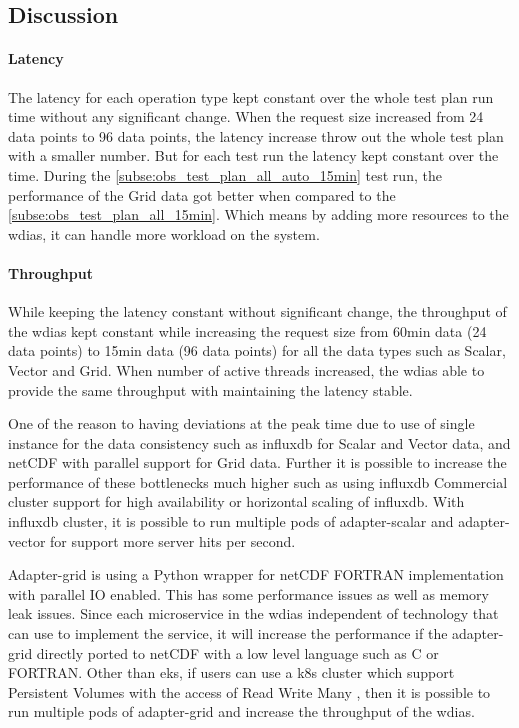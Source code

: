 \documentclass[conference]{IEEEtran}
\begin{document}
\subsection{Discussion}
\paragraph{Latency}
The latency for each operation type kept constant over the whole test plan run time without any significant change. When the request size increased from 24 data points to 96 data points, the latency increase throw out the whole test plan with a smaller number. But for each test run the latency kept constant over the time.
During the \ref{subse:obs_test_plan_all_auto_15min} test run, the performance of the Grid data got better when compared to the \ref{subse:obs_test_plan_all_15min}. Which means by adding more resources to the \acrshort{wdias}, it can handle more workload on the system.

\paragraph{Throughput}
While keeping the latency constant without significant change, the throughput of the \acrshort{wdias} kept constant while increasing the request size from 60min data (24 data points) to 15min data (96 data points) for all the data types such as Scalar, Vector and Grid.
When number of active threads increased, the \acrshort{wdias} able to provide the same throughput with maintaining the latency stable.

One of the reason to having deviations at the peak time due to use of single instance for the data consistency such as \acrshort{influxdb} for Scalar and Vector data, and netCDF with parallel support for Grid data. Further it is possible to increase the performance of these bottlenecks much higher such as using \acrshort{influxdb} Commercial cluster support for high availability or horizontal scaling of \acrshort{influxdb}. With \acrshort{influxdb} cluster, it is possible to run multiple pods of adapter-scalar and adapter-vector for support more server hits per second.

Adapter-grid is using a Python wrapper for netCDF FORTRAN implementation with parallel IO enabled. This has some performance issues as well as memory leak issues. Since each microservice in the \acrshort{wdias} independent of technology that can use to implement the service, it will increase the performance if the adapter-grid directly ported to netCDF with a low level language such as C or FORTRAN.
Other than \acrshort{eks}, if users can use a \acrshort{k8s} cluster which support Persistent Volumes with the access of Read Write  Many \cite{LinuxFoundationPersistentKubernetes} , then it is possible to run multiple pods of adapter-grid and increase the throughput of the \acrshort{wdias}.
\end{document}
